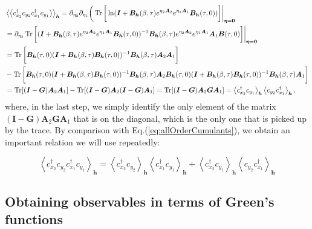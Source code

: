 \begin{equation}
\begin{split}
&\left\langle \left\langle c_{x_2}^\dagger c_{y_2} c_{x_1}^\dagger c_{y_1}  \right\rangle\right\rangle_{\bm h} = \partial_{\eta_2} \partial_{\eta_1} \bigg( \operatorname{Tr} \bigg[ \ln ( \bm I + \bm B_{\bm h} ( \beta, \tau ) e^{\eta_2 \bm A_2} e^{\eta_1 \bm A_1} \bm B_{\bm h} ( \tau, 0) ) \bigg] \bigg|_{\bm \eta = \bm 0 } \\
&= \partial_{\eta_2} \operatorname{Tr} \bigg[ ( \bm I + \bm B_{\bm h} ( \beta, \tau ) e^{\eta_2 \bm A_2} e^{\eta_1 \bm A_1} \bm B_{\bm h} ( \tau, 0) )^{-1} \bm B_{\bm h} ( \beta, \tau ) e^{\eta_2 \bm A_2} e^{\eta_1 \bm A_1} \bm A_1 \bm B ( \tau, 0 ) \bigg] \bigg|_{\bm \eta = \bm 0 } \\
&= \operatorname{Tr} \bigg [ \bm B_{\bm h} ( \tau, 0 ) ( \bm I + \bm B_{\bm h} ( \beta, \tau ) \bm B_{\bm h} ( \tau, 0) )^{-1} \bm B_{\bm h} ( \beta, \tau ) \bm A_2 \bm A_1  \bigg] \\
&- \operatorname{Tr} \bigg [ \bm B_{\bm h} ( \tau, 0 ) ( \bm I + \bm B_{\bm h} ( \beta, \tau ) \bm B_{\bm h} ( \tau, 0) )^{-1} \bm B_{\bm h} ( \beta, \tau ) \bm A_2 \bm B_{\bm h} ( \tau, 0 ) ( \bm I + \bm B_{\bm h} ( \beta, \tau ) \bm B_{\bm h} ( \tau, 0) )^{-1} \bm B_{\bm h} ( \beta, \tau ) \bm A_1  \bigg] \\
&= \operatorname{Tr} [ ( \bm I - \bm G ) \bm A_2 \bm A_1 ] - \operatorname{Tr} [ ( \bm I - \bm G ) \bm A_2 ( \bm I - \bm G ) \bm A_1 ] = \operatorname{Tr} [ ( \bm I - \bm G ) \bm A_2 \bm G \bm A_1 ] = \left\langle c_{x_2}^\dagger c_{y_1} \right\rangle_{\bm h} \left\langle c_{y_2} c_{x_1}^\dagger \right\rangle_{\bm h} ,
\end{split}
\end{equation}
where, in the last step, we simply identify the only element of the matrix  $( \bm I - \bm G ) \bm A_2 \bm G \bm A_1$ that is on the diagonal, which is the only one that is picked up by the trace.
By comparison with Eq.(\ref{eq:allOrderCumulants}), we obtain an important relation we will use repeatedly:

\begin{equation}
\left\langle c_{x_2}^\dagger c_{y_2} c_{x_1}^\dagger c_{y_1} \right\rangle_{\bm h} = \left\langle c_{x_2}^\dagger c_{y_2} \right\rangle_{\bm h} \left\langle c_{x_1}^\dagger c_{y_1} \right\rangle_{\bm h} + \left\langle c_{x_2}^\dagger c_{y_1} \right\rangle_{\bm h} \left\langle  c_{y_2} c_{x_1}^\dagger \right\rangle_{\bm h}
\end{equation}

\subsection{Obtaining observables in terms of Green's functions}
\label{subsec:observablesGreen}

